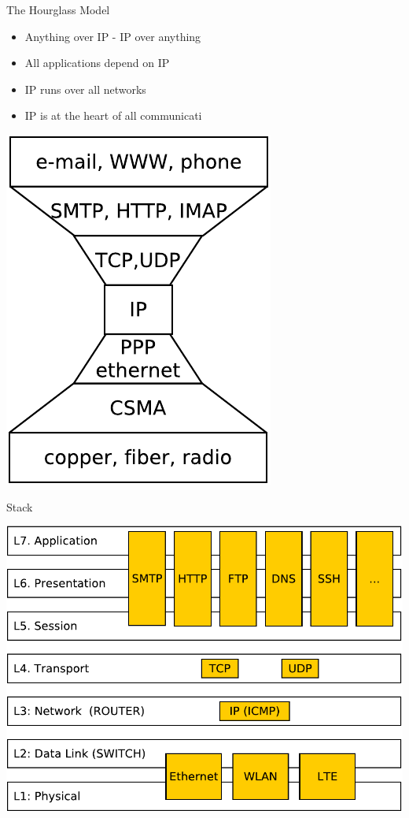 \documentclass{beamer}
\begin{document}
\begin{frame}{The Hourglass Model}
  \begin{itemize}
    \item Anything over IP - IP over anything
    \item All applications depend on IP
    \item IP runs over all networks
    \item IP is at the heart of all communicati
  \end{itemize}
  \begin{center}
    \includegraphics[width=0.4\linewidth]{net2}
  \end{center}
\end{frame}

\begin{frame}{Stack}
  \begin{center}
    \includegraphics[width=0.7\linewidth]{stack}
  \end{center}
\end{frame}
\end{document}
